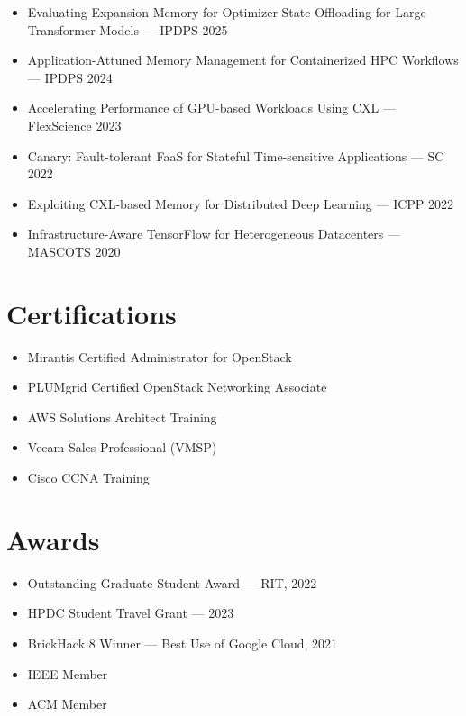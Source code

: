\documentclass[letterpaper,11pt]{article}
\begin{document}
\begin{itemize}[leftmargin=0.15in]
    \item Evaluating Expansion Memory for Optimizer State Offloading for Large Transformer Models --- IPDPS 2025
    \item Application-Attuned Memory Management for Containerized HPC Workflows --- IPDPS 2024
    \item Accelerating Performance of GPU-based Workloads Using CXL --- FlexScience 2023
    \item Canary: Fault-tolerant FaaS for Stateful Time-sensitive Applications --- SC 2022
    \item Exploiting CXL-based Memory for Distributed Deep Learning --- ICPP 2022
    \item Infrastructure-Aware TensorFlow for Heterogeneous Datacenters --- MASCOTS 2020
\end{itemize}

\section{Certifications}
\begin{itemize}[leftmargin=0.15in]
    \item Mirantis Certified Administrator for OpenStack
    \item PLUMgrid Certified OpenStack Networking Associate
    \item AWS Solutions Architect Training
    \item Veeam Sales Professional (VMSP)
    \item Cisco CCNA Training
\end{itemize}

\section{Awards}
\begin{itemize}[leftmargin=0.15in]
    \item Outstanding Graduate Student Award --- RIT, 2022
    \item HPDC Student Travel Grant --- 2023
    \item BrickHack 8 Winner --- Best Use of Google Cloud, 2021
    \item IEEE Member
    \item ACM Member
\end{itemize}
\end{document}
